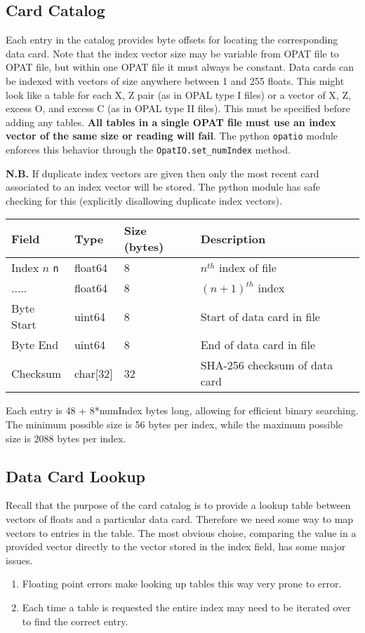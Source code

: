 \documentclass{article}
\begin{document}
\subsection{Card Catalog}
Each entry in the catalog provides byte offsets for locating the
corresponding data card.  Note that the index vector size may be
variable from OPAT file to OPAT file, but within one OPAT file it must always be
constant.  Data cards can be indexed with vectors of size anywhere between 1 and
255 floats.  This might look like a table for each X, Z pair (as in OPAL type I
files) or a vector of X, Z, excess O, and excess C (as in OPAL type II files). 
This must be specified before adding any tables.  \textbf{All tables in a single
OPAT file must use an index vector of the same size or reading will fail}.  The python
\texttt{opatio} module enforces this behavior through the
\texttt{OpatIO.set\_numIndex} method. 

\noindent\textbf{N.B.} If duplicate index vectors are given then only the most
recent card associated to an index vector will be stored.  The python module
has safe checking for this (explicitly disallowing duplicate index vectors). 
\begin{longtable}{|l|l|l|l|}
\hline
\textbf{Field} & \textbf{Type} & \textbf{Size (bytes)} & \textbf{Description} \\
\hline
Index $n$ \texttt{n} & float64 & 8 & $n^{th}$ index of file \\
..... & float64 & 8 & $(n+1)^{th}$ index \\
Byte Start & uint64 & 8 & Start of data card in file \\
Byte End & uint64 & 8 & End of data card in file \\
Checksum & char[32] & 32 & SHA-256 checksum of data card \\
\hline
\end{longtable} 

Each entry is 48 + 8*numIndex bytes long, allowing for efficient binary
searching.  The minimum possible size is 56 bytes per index, while the maximum
possible size is 2088 bytes per index. 

\subsection{Data Card Lookup}
Recall that the purpose of the card catalog is to provide a lookup table
between vectors of floats and a particular data card. Therefore we need some
way to map vectors to entries in the table. The most obvious choise, comparing
the value in a provided vector directly to the vector stored in the index
field, has some major issues. 
\begin{enumerate}
  \item Floating point errors make looking up tables this way very prone to error.
  \item Each time a table is requested the entire index may need to be iterated over to find the correct entry.
\end{enumerate}
\end{document}
